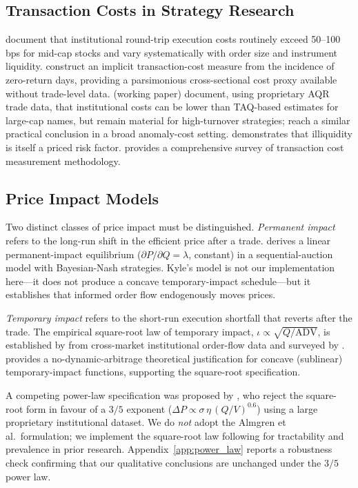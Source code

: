 \documentclass[12pt]{article}
\begin{document}
\subsection{Transaction Costs in Strategy Research}

\citet{keim1997transactions} document that institutional round-trip
execution costs routinely exceed 50--100 bps for mid-cap stocks and
vary systematically with order size and instrument liquidity.
\citet{lesmond1999new} construct an implicit transaction-cost measure
from the incidence of zero-return days, providing a parsimonious
cross-sectional cost proxy available without trade-level data.
\citet{frazzini2015trading} (working paper) document, using proprietary
AQR trade data, that institutional costs can be lower than TAQ-based
estimates for large-cap names, but remain material for high-turnover
strategies; \citet{novymarx2016taxonomy} reach a similar practical
conclusion in a broad anomaly-cost setting.
\citet{amihud2002illiquidity} demonstrates that illiquidity is itself
a priced risk factor. \citet{hasbrouck2009trading} provides a
comprehensive survey of transaction cost measurement methodology.

\subsection{Price Impact Models}

Two distinct classes of price impact must be distinguished.
\emph{Permanent impact} refers to the long-run shift in the efficient
price after a trade. \citet{kyle1985continuous} derives a linear
permanent-impact equilibrium ($\partial P/\partial Q = \lambda$,
constant) in a sequential-auction model with Bayesian-Nash strategies.
Kyle's model is not our implementation here---it does not produce a
concave temporary-impact schedule---but it establishes that informed
order flow endogenously moves prices.

\emph{Temporary impact} refers to the short-run execution shortfall
that reverts after the trade. The empirical square-root law of
temporary impact, $\iota \propto \sqrt{Q/\mathrm{ADV}}$, is
established by \citet{lillo2003master} from cross-market institutional
order-flow data and surveyed by \citet{bouchaud2009theory}.
\citet{gatheral2010no} provides a no-dynamic-arbitrage theoretical
justification for concave (sublinear) temporary-impact functions,
supporting the square-root specification.

A competing power-law specification was proposed by
\citet{almgren2005direct}, who reject the square-root form in favour of
a $3/5$ exponent ($\Delta P \propto \sigma\,\eta\,(Q/V)^{0.6}$) using
a large proprietary institutional dataset. We do \emph{not} adopt the
Almgren et al.\ formulation; we implement the square-root law following
\citet{lillo2003master} for tractability and prevalence in prior research.
Appendix~\ref{app:power_law} reports a robustness check confirming that
our qualitative conclusions are unchanged under the $3/5$ power law.
\end{document}
